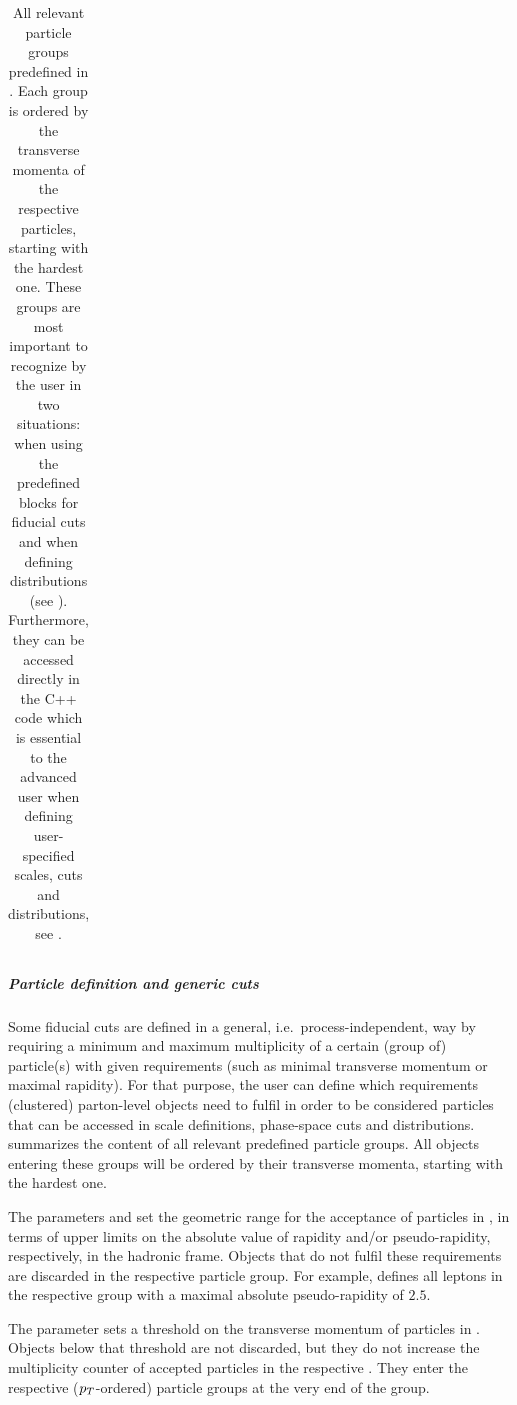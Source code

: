 \documentclass[english,11pt]{article}
\begin{document}
\begin{table}
\begin{center}
\begin{tabular}{lcl}
\bottomrule
\end{tabular}
\end{center}
\renewcommand{\baselinestretch}{1.0}
  \caption{All relevant particle groups predefined in \Matrix{}. Each group is ordered by the transverse momenta of the respective particles, 
  starting with the hardest one. These groups are most important to recognize by the user in two situations: 
  when using the predefined blocks for fiducial cuts and when defining distributions (see ). Furthermore, they can be accessed directly in 
  the C++ code which is essential to the advanced user when defining user-specified scales, cuts and distributions, see
  .} 
  \label{tab:predefinedparticles}
\end{table}
\renewcommand\arraystretch{1.1}


\subparagraph{Particle definition and generic cuts}\quad

Some fiducial cuts are defined in a general, i.e.\ process-independent, way by requiring a minimum and maximum 
multiplicity of a certain (group of) particle(s) with given requirements (such as minimal transverse momentum or maximal rapidity). 
For that purpose, the user can define which requirements (clustered) parton-level objects 
need to fulfil in order to be considered particles that can 
be accessed in scale definitions, phase-space cuts and distributions.
 summarizes the content of all relevant predefined particle groups. All objects entering these groups will be ordered by
their transverse momenta, starting with the hardest one.

The parameters  and  set the geometric range for the acceptance of
particles in , %
in terms of upper limits on the absolute value of rapidity and/or pseudo-rapidity, respectively, in the hadronic frame.
Objects that do not fulfil these requirements are discarded in the respective particle group. For example,  defines all leptons in the 
respective group with a maximal absolute pseudo-rapidity of $2.5$.

The parameter  sets a threshold on the transverse momentum of particles in . Objects below that threshold are not discarded, but they do not increase
the multiplicity counter of accepted particles in the respective . %
They enter the respective ($p_T{}$-ordered) particle groups at the very end of the group.
\end{document}
